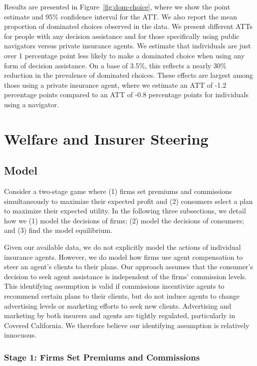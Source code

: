 \documentclass[12pt]{article}
\begin{document}
Results are presented in Figure~\ref{fig:dom-choice}, where we show the point estimate and 95\% confidence interval for the ATT. We also report the mean proportion of dominated choices observed in the data. We present different ATTs for people with any decision assistance and for those specifically using public navigators versus private insurance agents. We estimate that individuals are just over 1 percentage point less likely to make a dominated choice when using any form of decision assistance. On a base of 3.5\%, this reflects a nearly 30\% reduction in the prevalence of dominated choices. These effects are largest among those using a private insurance agent, where we estimate an ATT of -1.2 percentage points compared to an ATT of -0.8 percentage points for individuals using a navigator.


\section{Welfare and Insurer Steering}
\label{sec:steering}

\subsection{Model}
\label{subsec:steering-model}

Consider a two-stage  game where  (1) firms set premiums and commissions simultaneously to maximize their expected profit and (2) consumers select a plan to maximize their expected utility. In the following three subsections, we detail how we (1) model the decisions of firms; (2) model the decisions of consumers; and (3) find the model equilibrium.  

Given our available data, we do not explicitly model the actions of individual insurance agents.  However, we do model how firms use agent compensation to steer an agent's clients to their plans.  Our approach assumes that the consumer's decision to seek agent assistance is independent of the firms' commission levels.  This identifying assumption is valid if commissions incentivize agents to recommend certain plans to their clients, but do not induce agents to change advertising levels or marketing efforts to  seek new clients. Advertising and marketing by both insurers and agents are tightly regulated, particularly in Covered California.  We therefore believe our identifying assumption is relatively  innocuous.   

\subsubsection{Stage 1: Firms Set Premiums and Commissions}
\end{document}

